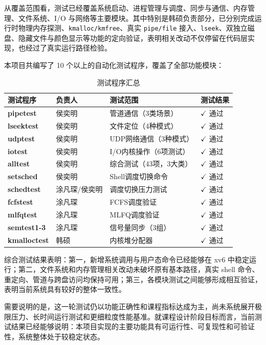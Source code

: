 \documentclass[12pt,a4paper]{ctexart}
\begin{document}
从覆盖范围看，测试已经覆盖系统启动、进程管理与调度、同步与通信、内存管理、文件系统、I/O 与网络等主要模块。其中特别是韩硕负责部分，已分别完成运行时物理内存探测、\texttt{kmalloc/kmfree}、真实 \texttt{pipe/file} 接入、\texttt{lseek}、双独立磁盘、隐藏文件与颜色显示等功能的定向验证，表明相关改动不仅停留在代码层实现，也经过了真实运行路径检验。

本项目共编写了 10 个以上的自动化测试程序，覆盖了全部功能模块：

\begin{table}[H]
\centering
\caption{测试程序汇总}
\begin{tabular}{>{\bfseries}p{3cm}p{2cm}p{4.5cm}p{3cm}}
\toprule
\textbf{测试程序} & \textbf{负责人} & \textbf{测试范围} & \textbf{测试结果} \\
\midrule
pipetest   & 侯奕明 & 管道通信（3类场景） & $\checkmark$ 通过 \\
lseektest  & 侯奕明 & 文件定位（4种模式） & $\checkmark$ 通过 \\
udptest    & 侯奕明 & UDP网络通信（3种模式） & $\checkmark$ 通过 \\
iotest     & 侯奕明 & I/O内核操作（6项测试） & $\checkmark$ 通过 \\
alltest    & 侯奕明 & 综合测试（43项，3大类） & $\checkmark$ 通过 \\
setsched   & 侯奕明 & Shell调度切换命令 & $\checkmark$ 通过 \\
schedtest  & 涂凡琛/侯奕明 & 调度切换压力测试 & $\checkmark$ 通过 \\
fcfstest   & 涂凡琛 & FCFS调度验证 & $\checkmark$ 通过 \\
mlfqtest   & 涂凡琛 & MLFQ调度验证 & $\checkmark$ 通过 \\
semtest1-3 & 涂凡琛 & 信号量同步（3组） & $\checkmark$ 通过 \\
kmalloctest& 韩硕 & 内核堆分配器 & $\checkmark$ 通过 \\
\bottomrule
\end{tabular}
\end{table}

综合测试结果表明：第一，新增系统调用与用户态命令已经能够在 xv6 中稳定运行；第二，文件系统和内存管理相关改动未破坏原有基本路径，真实 shell 命令、重定向、管道与跨盘访问均保持可用；第三，各模块测试之间能够形成相互验证，表明当前系统具有较好的整体一致性。

需要说明的是，这一轮测试仍以功能正确性和课程指标达成为主，尚未系统展开极限压力、长时间运行测试和更细粒度性能基准。就课程设计阶段目标而言，当前测试结果已经能够说明：本项目实现的主要功能具有可运行性、可复现性和可验证性，系统整体处于较稳定状态。
\end{document}
